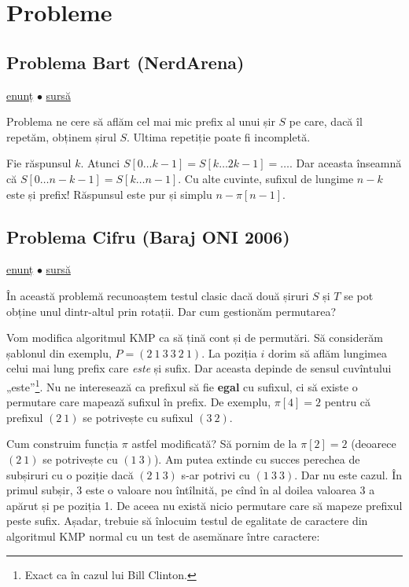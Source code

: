 \documentclass[../main.tex]{subfiles}
\begin{document}
\section{Probleme}

\subsection{Problema Bart (NerdArena)}
\label{problem:bart}

\href{https://www.nerdarena.ro/problema/bart}{enunț}
$\bullet$
\hyperref[code:bart]{sursă}

Problema ne cere să aflăm cel mai mic prefix al unui șir $S$ pe care, dacă îl repetăm, obținem șirul $S$. Ultima repetiție poate fi incompletă.

Fie răspunsul $k$. Atunci $S[0 \dots k-1] = S[k \dots 2k-1] = \dots$. Dar aceasta înseamnă că $S[0 \dots n - k - 1] = S[k \dots n - 1]$. Cu alte cuvinte, sufixul de lungime $n - k$ este și prefix! Răspunsul este pur și simplu $n - \pi[n - 1]$.

\subsection{Problema Cifru (Baraj ONI 2006)}
\label{problem:cifru}

\href{https://kilonova.ro/problems/1862}{enunț}
$\bullet$
\hyperref[code:cifru]{sursă}

În această problemă recunoaștem testul clasic dacă două șiruri $S$ și $T$ se pot obține unul dintr-altul prin rotații. Dar cum gestionăm permutarea?

Vom modifica algoritmul KMP ca să țină cont și de permutări. Să considerăm șablonul din exemplu, $P = (2\ 1\ 3\ 3\ 2\ 1)$. La poziția $i$ dorim să aflăm lungimea celui mai lung prefix care \textit{este} și sufix. Dar aceasta depinde de sensul cuvîntului „este”\footnote{Exact ca în cazul lui Bill Clinton.}. Nu ne interesează ca prefixul să fie \textbf{egal} cu sufixul, ci să existe o permutare care mapează sufixul în prefix. De exemplu, $\pi[4]=2$ pentru că prefixul $(2\ 1)$ se potrivește cu sufixul $(3\ 2)$.

Cum construim funcția $\pi$ astfel modificată? Să pornim de la $\pi[2] = 2$ (deoarece $(2\ 1)$ se potrivește cu $(1\ 3)$). Am putea extinde cu succes perechea de subșiruri cu o poziție dacă $(2\ 1\ 3)$ s-ar potrivi cu $(1\ 3\ 3)$. Dar nu este cazul. În primul subșir, 3 este o valoare nou întîlnită, pe cînd în al doilea valoarea 3 a apărut și pe poziția 1. De aceea nu există nicio permutare care să mapeze prefixul peste sufix. Așadar, trebuie să înlocuim testul de egalitate de caractere din algoritmul KMP normal cu un test de asemănare între caractere:
\end{document}
